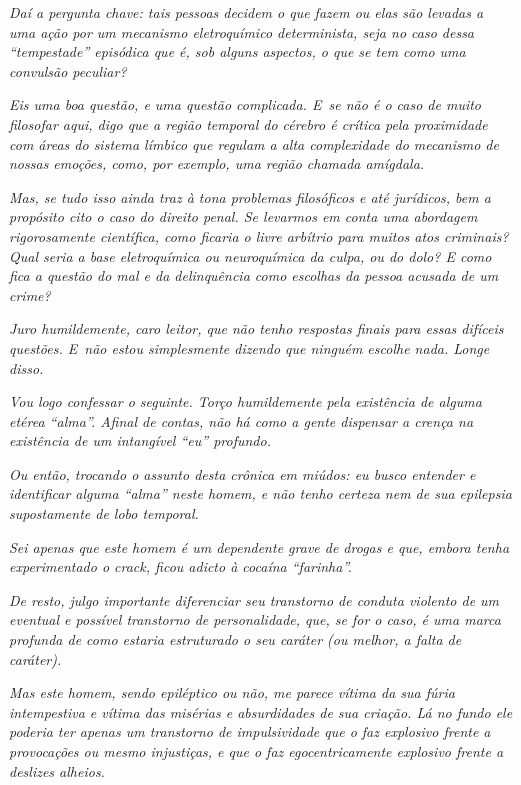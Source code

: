\emph{Daí a pergunta chave: tais pessoas decidem o que fazem ou elas são
levadas a uma ação por um mecanismo eletroquímico determinista, seja no
caso dessa ``tempestade'' episódica que é, sob alguns aspectos, o que se
tem como uma convulsão peculiar?}~

\emph{Eis uma boa questão, e uma questão complicada. E~se não é o caso
de muito filosofar aqui, digo que a região temporal do cérebro é crítica
pela proximidade com áreas do sistema límbico que regulam a alta
complexidade do mecanismo de nossas emoções, como, por exemplo, uma
região chamada amígdala.}~

\emph{Mas, se tudo isso ainda traz à tona problemas filosóficos e até
jurídicos, bem a propósito cito o caso do direito penal. Se levarmos em
conta uma abordagem rigorosamente científica, como ficaria o livre
arbítrio para muitos atos criminais? Qual seria a base eletroquímica ou
neuroquímica da culpa, ou do dolo? E como fica a questão do mal e da
delinquência como escolhas da pessoa acusada de um crime?}~

\emph{Juro humildemente, caro leitor, que não tenho respostas finais
para essas difíceis questões. E~não estou simplesmente dizendo que
ninguém escolhe nada. Longe disso.}~

\emph{Vou logo confessar o seguinte. Torço humildemente pela existência
de alguma etérea ``alma''. Afinal de contas, não há como a gente
dispensar a crença na existência de um intangível ``eu'' profundo.}~

\emph{Ou então, trocando o assunto desta crônica em miúdos: eu busco
entender e identificar alguma ``alma'' neste homem, e não tenho certeza
nem de sua epilepsia supostamente de lobo temporal.}~

\emph{Sei apenas que este homem é um dependente grave de drogas e que,
embora tenha experimentado o crack, ficou adicto à cocaína
``farinha''.}~

\emph{De resto, julgo importante diferenciar seu transtorno de conduta
violento de um eventual e possível transtorno de personalidade, que, se
for o caso, é uma marca profunda de como estaria estruturado o seu
caráter (ou melhor, a falta de caráter).}~

\emph{Mas este homem, sendo epiléptico ou não, me parece vítima da sua
fúria intempestiva e vítima das misérias e absurdidades de sua criação.
Lá no fundo ele poderia ter apenas um transtorno de impulsividade que o
faz explosivo frente a provocações ou mesmo injustiças, e que o faz
egocentricamente explosivo frente a deslizes alheios.}~

